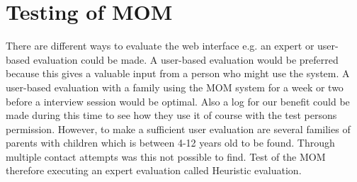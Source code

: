 \chapter{Testing of MOM}
There are different ways to evaluate the web interface e.g. an expert or user-based evaluation could be made. A user-based evaluation would be preferred because this gives a valuable input from a person who might use the system. A user-based evaluation with a family using the MOM system for a week or two before a interview session would be optimal. Also a log for our benefit could be made during this time to see how they use it of course with the test persons permission. However, to make a sufficient user evaluation are several families of parents with children which is between 4-12 years old to be found. Through multiple contact attempts was this not possible to find. Test of the MOM therefore executing an expert evaluation called Heuristic evaluation. 

